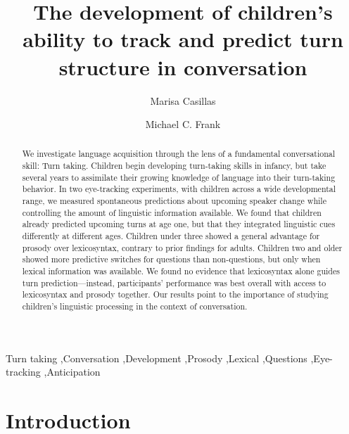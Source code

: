 \documentclass[authoryear, 12pt]{elsarticle}
\begin{document}
\begin{frontmatter}

\title{The development of children's ability to track and predict turn structure in conversation}

\author[MPI]{Marisa Casillas}
\address[MPI]{Max Planck Institute for Psycholinguistics, Nijmegen}

\author[StanfordPSY]{Michael C. Frank}

\address[StanfordPSY]{Department of Psychology, Stanford University}

\begin{abstract}
We investigate language acquisition through the lens of a fundamental conversational skill: Turn taking. Children begin developing turn-taking skills in infancy, but take several years to assimilate their growing knowledge of language into their turn-taking behavior. In two eye-tracking experiments, with children across a wide developmental range, we measured spontaneous predictions about upcoming speaker change while controlling the amount of linguistic information available. We found that children already predicted upcoming turns at age one, but that they integrated linguistic cues differently at different ages. Children under three showed a general advantage for prosody over lexicosyntax, contrary to prior findings for adults. Children two and older showed more predictive switches for questions than non-questions, but only when lexical information was available. We found no evidence that lexicosyntax alone guides turn prediction---instead, participants' performance was best overall with access to lexicosyntax and prosody together. Our results point to the importance of studying children's linguistic processing in the context of conversation.
\end{abstract}

\begin{keyword}
Turn taking \sep Conversation \sep Development \sep Prosody \sep Lexical \sep Questions \sep Eye-tracking \sep Anticipation

\end{keyword}

\end{frontmatter}


\section{Introduction}
\label{sec:intro}
\end{document}
